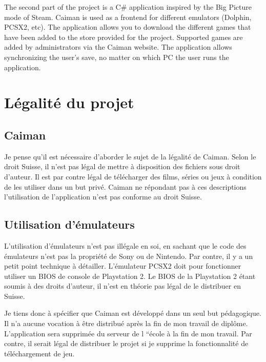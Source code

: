 \documentclass[a4paper,12pt,french]{sphinxmanual}
\begin{document}
\sphinxAtStartPar
The second part of the project is a C\# application inspired by the Big Picture mode of Steam. Caiman is used as a frontend for different emulators (Dolphin, PCSX2, etc). The application allows you to download the different games that have been added to the store provided for the project. Supported games are added by administrators via the Caiman website. The application allows synchronizing the user’s save, no matter on which PC the user runs the application.


\section{Légalité du projet}
\label{\detokenize{introduction:legalite-du-projet}}

\subsection{Caiman}
\label{\detokenize{introduction:caiman}}
\sphinxAtStartPar
Je pense qu’il est nécessaire d’aborder le sujet de la légalité de Caiman. Selon le droit Suisse, il n’est pas légal de mettre à disposition des fichiers sous droit d’auteur. Il est par contre légal de télécharger des films, séries ou jeux à condition de les utiliser dans un but privé. Caiman ne répondant pas à ces descriptions l’utilisation de l’application n’est pas conforme au droit Suisse.


\subsection{Utilisation d’émulateurs}
\label{\detokenize{introduction:utilisation-demulateurs}}
\sphinxAtStartPar
L’utilisation d’émulateurs n’est pas illégale en soi, en sachant que le code des émulateurs n’est pas la propriété de Sony ou de Nintendo. Par contre, il y a un petit point technique à détailler. L’émulateur PCSX2 doit pour fonctionner utiliser un BIOS de console de Playstation 2. Le BIOS de la Playstation 2 étant soumis à des droits d’auteur, il n’est en théorie pas légal de le distribuer en Suisse.

\sphinxAtStartPar
Je tiens donc à spécifier que Caiman est développé dans un seul but pédagogique. Il n’a aucune vocation à être distribué après la fin de mon travail de diplôme. L’application sera supprimée du serveur de l “école à la fin de mon travail. Par contre, il serait légal de distribuer le projet si je supprime la fonctionnalité de téléchargement de jeu.
\end{document}
